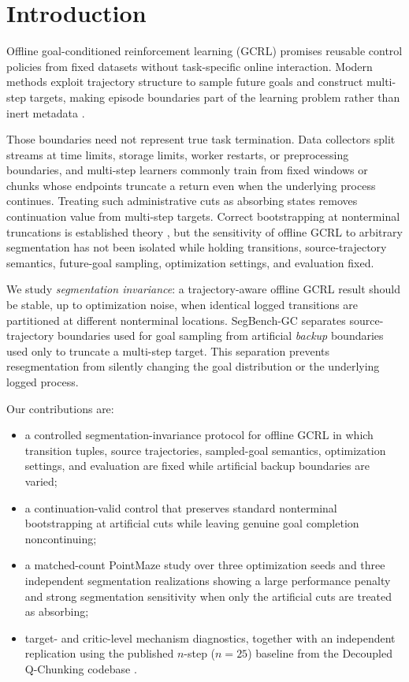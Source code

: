 \section{Introduction}

Offline goal-conditioned reinforcement learning (GCRL) promises reusable control policies from fixed datasets without task-specific online interaction. Modern methods exploit trajectory structure to sample future goals and construct multi-step targets, making episode boundaries part of the learning problem rather than inert metadata \cite{ogbench2024}.

Those boundaries need not represent true task termination. Data collectors split streams at time limits, storage limits, worker restarts, or preprocessing boundaries, and multi-step learners commonly train from fixed windows or chunks whose endpoints truncate a return even when the underlying process continues. Treating such administrative cuts as absorbing states removes continuation value from multi-step targets. Correct bootstrapping at nonterminal truncations is established theory \cite{pardo2018timelimits}, but the sensitivity of offline GCRL to arbitrary segmentation has not been isolated while holding transitions, source-trajectory semantics, future-goal sampling, optimization settings, and evaluation fixed.

We study \emph{segmentation invariance}: a trajectory-aware offline GCRL result should be stable, up to optimization noise, when identical logged transitions are partitioned at different nonterminal locations. SegBench-GC separates source-trajectory boundaries used for goal sampling from artificial \emph{backup} boundaries used only to truncate a multi-step target. This separation prevents resegmentation from silently changing the goal distribution or the underlying logged process.

Our contributions are:
\begin{itemize}
  \item a controlled segmentation-invariance protocol for offline GCRL in which transition tuples, source trajectories, sampled-goal semantics, optimization settings, and evaluation are fixed while artificial backup boundaries are varied;
  \item a continuation-valid control that preserves standard nonterminal bootstrapping at artificial cuts while leaving genuine goal completion noncontinuing;
  \item a matched-count PointMaze study over three optimization seeds and three independent segmentation realizations showing a large performance penalty and strong segmentation sensitivity when only the artificial cuts are treated as absorbing;
  \item target- and critic-level mechanism diagnostics, together with an independent replication using the published $n$-step ($n=25$) baseline from the Decoupled Q-Chunking codebase \cite{li2026dqc}.
\end{itemize}

